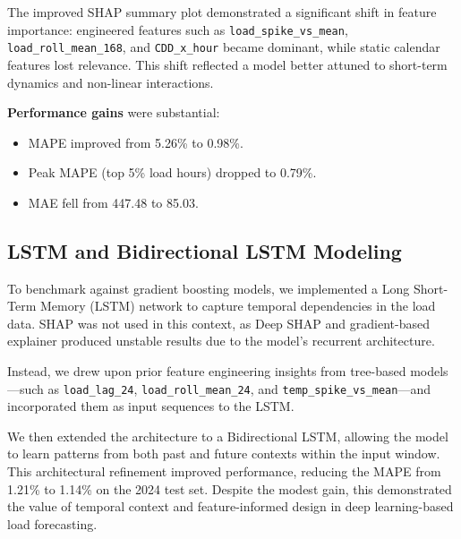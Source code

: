\documentclass[final,numbered]{ifacconf}
\begin{document}
The improved SHAP summary plot demonstrated a significant shift in feature importance: engineered features such as \texttt{load\_spike\_vs\_mean}, \texttt{load\_roll\_mean\_168}, and \texttt{CDD\_x\_hour} became dominant, while static calendar features lost relevance. This shift reflected a model better attuned to short-term dynamics and non-linear interactions.

\textbf{Performance gains} were substantial:
\begin{itemize}
    \item MAPE improved from 5.26\% to 0.98\%.
    \item Peak MAPE (top 5\% load hours) dropped to 0.79\%.
    \item MAE fell from 447.48 to 85.03.
\end{itemize}



\subsection*{LSTM and Bidirectional LSTM Modeling}

To benchmark against gradient boosting models, we implemented a Long Short-Term Memory (LSTM) network to capture temporal dependencies in the load data. SHAP was not used in this context, as Deep SHAP and gradient-based explainer produced unstable results due to the model's recurrent architecture.

Instead, we drew upon prior feature engineering insights from tree-based models—such as \texttt{load\_lag\_24}, \texttt{load\_roll\_mean\_24}, and \texttt{temp\_spike\_vs\_mean}—and incorporated them as input sequences to the LSTM.

We then extended the architecture to a Bidirectional LSTM, allowing the model to learn patterns from both past and future contexts within the input window. This architectural refinement improved performance, reducing the MAPE from 1.21\% to 1.14\% on the 2024 test set. Despite the modest gain, this demonstrated the value of temporal context and feature-informed design in deep learning-based load forecasting.
\end{document}
